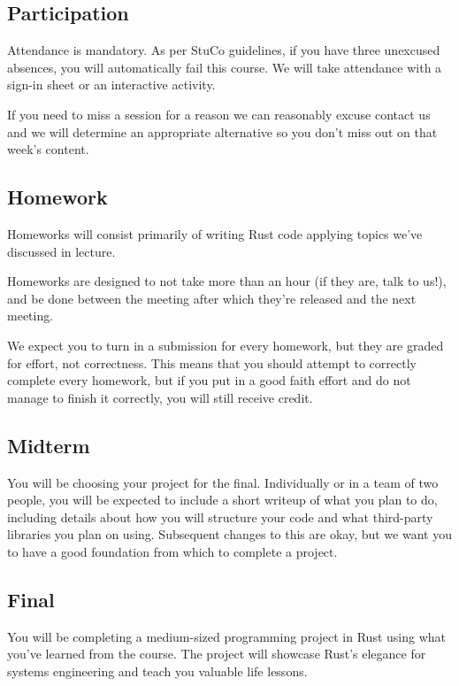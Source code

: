\documentclass{article}
\begin{document}
\subsection*{Participation}

Attendance is mandatory. As per StuCo guidelines, if you have three unexcused
absences, you will automatically fail this course. We will take attendance with
a sign-in sheet or an interactive activity.

If you need to miss a session for a reason we can reasonably excuse contact us
and we will determine an appropriate alternative so you don't miss out on that
week's content.

\subsection*{Homework}
 
Homeworks will consist primarily of writing Rust code applying topics we've
discussed in lecture.

Homeworks are designed to not take more than an hour (if they are, talk to us!),
and be done between the meeting after which they're released and the next
meeting.

We expect you to turn in a submission for every homework, but they are graded
for effort, not correctness. This means that you should attempt to correctly
complete every homework, but if you put in a good faith effort and do not manage
to finish it correctly, you will still receive credit.

\subsection*{Midterm}

You will be choosing your project for the final. Individually or in a team of
two people, you will be expected to include a short writeup of what you plan to
do, including details about how you will structure your code and what
third-party libraries you plan on using. Subsequent changes to this are okay,
but we want you to have a good foundation from which to complete a project.

\subsection*{Final}

You will be completing a medium-sized programming project in Rust using what
you've learned from the course. The project will showcase Rust's elegance for
systems engineering and teach you valuable life lessons.
\end{document}
